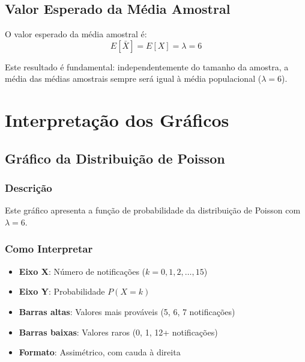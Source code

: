 \documentclass[12pt,a4paper]{article}
\begin{document}
\subsection{Valor Esperado da Média Amostral}

\begin{definicao}
O valor esperado da média amostral é:
\begin{equation}
E[\bar{X}] = E[X] = \lambda = 6
\end{equation}
\end{definicao}

\begin{importante}
Este resultado é fundamental: independentemente do tamanho da amostra, a média das médias amostrais sempre será igual à média populacional ($\lambda = 6$).
\end{importante}


\section{Interpretação dos Gráficos}

\subsection{Gráfico da Distribuição de Poisson}

\subsubsection{Descrição}
Este gráfico apresenta a função de probabilidade da distribuição de Poisson com $\lambda = 6$.

\subsubsection{Como Interpretar}
\begin{itemize}
    \item \textbf{Eixo X}: Número de notificações ($k = 0, 1, 2, \ldots, 15$)
    \item \textbf{Eixo Y}: Probabilidade $P(X = k)$
    \item \textbf{Barras altas}: Valores mais prováveis (5, 6, 7 notificações)
    \item \textbf{Barras baixas}: Valores raros (0, 1, 12+ notificações)
    \item \textbf{Formato}: Assimétrico, com cauda à direita
\end{itemize}
\end{document}
